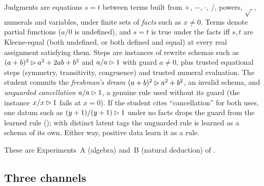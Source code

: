 \begin{example}\label{ex:setting:alg}
Judgments are equations $s=t$ between terms built from $+$, $-$, $\cdot$, $/$,
powers, $\sqrt{\ }$, numerals and variables, under finite sets of \emph{facts} such as $x\neq0$. Terms
denote partial functions ($a/0$ is undefined), and $s=t$ is true under the facts
iff $s,t$ are Kleene-equal (both undefined, or both defined and equal) at every
real assignment satisfying them. Steps are instances of rewrite schemas such as
$(a+b)^2\rhd a^2+2ab+b^2$ and $a/a\rhd1$ with guard $a\neq0$, plus trusted
equational steps (symmetry, transitivity, congruence) and trusted numeral
evaluation. The student commits the \emph{freshman's dream} $(a+b)^2\rhd
a^2+b^2$, an invalid schema, and \emph{unguarded cancellation} $a/a\rhd1$, a
genuine rule used without its guard (the instance $x/x\rhd1$ fails at $x=0$). If
the student cites ``cancellation'' for both uses, one datum such as
$(y+1)/(y+1)\rhd1$ under no facts drops the guard from the learned rule
(); with distinct latent tags the unguarded rule is learned
as a schema of its own. Either way, positive data learn it as a rule.
\end{example}

These are Experiments~A (algebra) and~B (natural deduction) of
.

\subsection{Three channels}\label{sec:setting:channels}

